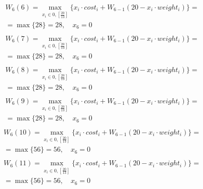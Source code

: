 \documentclass[17pt]{extarticle}
\begin{document}
\[
    \begin{aligned}
         & W_6(6)=\max_{x_i \in \overline{0, \left[\frac{20}{13}\right]}} \{x_i \cdot cost_i + W_{6-1}(20 - x_i \cdot weight_i)\}= \\& = \max \{
        28\}= 28, \quad x_6 = 0                                                                                                    \\
    \end{aligned}
\]
\[
    \begin{aligned}
         & W_6(7)=\max_{x_i \in \overline{0, \left[\frac{20}{13}\right]}} \{x_i \cdot cost_i + W_{6-1}(20 - x_i \cdot weight_i)\}= \\& = \max \{
        28\}= 28, \quad x_6 = 0                                                                                                    \\
    \end{aligned}
\]
\[
    \begin{aligned}
         & W_6(8)=\max_{x_i \in \overline{0, \left[\frac{20}{13}\right]}} \{x_i \cdot cost_i + W_{6-1}(20 - x_i \cdot weight_i)\}= \\& = \max \{
        28\}= 28, \quad x_6 = 0                                                                                                    \\
    \end{aligned}
\]
\[
    \begin{aligned}
         & W_6(9)=\max_{x_i \in \overline{0, \left[\frac{20}{13}\right]}} \{x_i \cdot cost_i + W_{6-1}(20 - x_i \cdot weight_i)\}= \\& = \max \{
        28\}= 28, \quad x_6 = 0                                                                                                    \\
    \end{aligned}
\]
\[
    \begin{aligned}
         & W_6(10)=\max_{x_i \in \overline{0, \left[\frac{20}{13}\right]}} \{x_i \cdot cost_i + W_{6-1}(20 - x_i \cdot weight_i)\}= \\& = \max \{
        56\}= 56, \quad x_6 = 0                                                                                                     \\
    \end{aligned}
\]
\[
    \begin{aligned}
         & W_6(11)=\max_{x_i \in \overline{0, \left[\frac{20}{13}\right]}} \{x_i \cdot cost_i + W_{6-1}(20 - x_i \cdot weight_i)\}= \\& = \max \{
        56\}= 56, \quad x_6 = 0                                                                                                     \\
    \end{aligned}
\]
\end{document}

